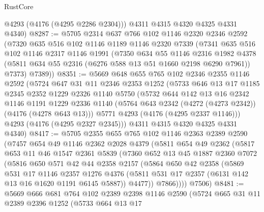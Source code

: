 \begin{lexlean}{RustCore}
\begin{coremodule}
        @4293
        (@4176 (@4295 @2286 @2304)))
      @4311
      @4315
      @4320
      @4325
      @4331
      @4340)
@8287 := @5705
    @2314
    @637
    @766
    @102
    @1146
    @2320
    @2346
    @2592
    (@7320
      @635
      @516
      @102
      @1146
      @1189
      @1146
      @2320
      @7339
      (@7341
        @635
        @516
        @102
        @1146
        @2317
        @1146
        @1991
        (@7350
          @634
          @55
          @1146
          @2316
          @1982
          @4378
          (@5811 @634 @55 @2316 (@6276 @588 @13 @51 @1660 @2198 @6290 @7961))
          @7373)
        @7389))
@8351 := @5669
    @648
    @655
    @765
    @102
    @2346
    @2355
    @1146
    @2592
    (@5724
      @647
      @31
      @11
      @2346
      @2353
      @1252
      (@5733
        @646
        @13
        @17
        @1185
        @2345
        @2352
        @1229
        @2326
        @1140
        @5750
        (@5732
          @644
          @142
          @13
          @16
          @2342
          @1146
          @1191
          @1229
          @2336
          @1140
          (@5764 @643 @2342 (@4272 (@4273 @2342)) (@4176 (@4278 @643 @13)))
          @5771
          @4293
          (@4176 (@4295 @2337 @1146)))
        @4293
        (@4176 (@4295 @2327 @2345)))
      @4311
      @4315
      @4320
      @4325
      @4331
      @4340)
@8417 := @5705
    @2355
    @655
    @765
    @102
    @1146
    @2363
    @2389
    @2590
    (@7457
      @654
      @49
      @1146
      @2362
      @2028
      @4379
      (@5811
        @654
        @49
        @2362
        (@5817
          @653
          @11
          @46
          @1547
          @2361
          @5839
          (@7360
            @652
            @13
            @45
            @1887
            @2360
            @7072
            (@5816
              @650
              @571
              @42
              @44
              @2358
              @2157
              (@5864
                @650
                @42
                @2358
                (@5869
                  @531
                  @17
                  @1146
                  @2357
                  @1276
                  @4376
                  (@5811 @531 @17 @2357 (@6131 @142 @13 @16 @1620 @1191 @6145 @5887))
                  @4477))
              @7866))))
      @7506)
@8481 := @5669
    @666
    @681
    @764
    @102
    @2389
    @2398
    @1146
    @2590
    (@5724
      @665
      @31
      @11
      @2389
      @2396
      @1252
      (@5733
        @664
        @13
        @17

\end{coremodule}
\end{lexlean}
